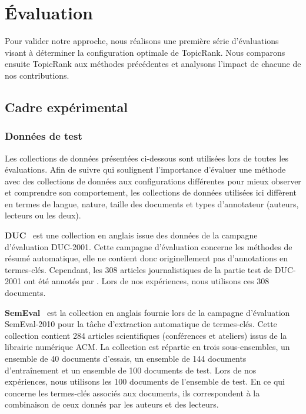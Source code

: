 \section{Évaluation}
\label{sec:evaluation}
  Pour valider notre approche, nous réalisons une première série d'évaluations
  visant à déterminer la configuration optimale de TopicRank. Nous comparons 
  ensuite TopicRank aux méthodes précédentes et analysons l'impact de chacune de
  nos contributions.

  \subsection{Cadre expérimental}
  \label{subsec:cadre_experimental}
    \subsubsection{Données de test}
    \label{subsubsec:donnees_de_test}
      Les collections de données présentées ci-dessous sont utilisées lors de
      toutes les évaluations. Afin de suivre  qui
      soulignent l'importance d'évaluer une méthode avec des collections de
      données aux configurations différentes pour mieux observer et comprendre
      son comportement, les collections de données utilisées ici diffèrent en
      termes de langue, nature, taille des documents et types d'annotateur
      (auteurs, lecteurs ou les deux).

      \textbf{DUC}~\cite{over2001duc} est une collection en anglais issue des
      données de la campagne d'évaluation DUC-2001. Cette campagne d'évaluation
      concerne les méthodes de résumé automatique, elle ne contient donc
      originellement pas d'annotations en termes-clés. Cependant, les 308
      articles journalistiques de la partie test de DUC-2001 ont été annotés par
      . Lors de nos expériences, nous utilisons ces
      308 documents.

      \textbf{SemEval}~\cite{kim2010semeval} est la collection en anglais
      fournie lors de la campagne d'évaluation SemEval-2010 pour la tâche
      d'extraction automatique de termes-clés. Cette collection contient 284
      articles scientifiques (conférences et ateliers) issus de la librairie
      numérique ACM. La collection est répartie en trois sous-ensembles, un
      ensemble de 40 documents d'essais, un ensemble de 144 documents
      d'entraînement et un ensemble de 100 documents de test. Lors de nos
      expériences, nous utilisons les 100 documents de l'ensemble de test. En ce
      qui concerne les termes-clés associés aux documents, ils correspondent à
      la combinaison de ceux donnés par les auteurs et des lecteurs.

